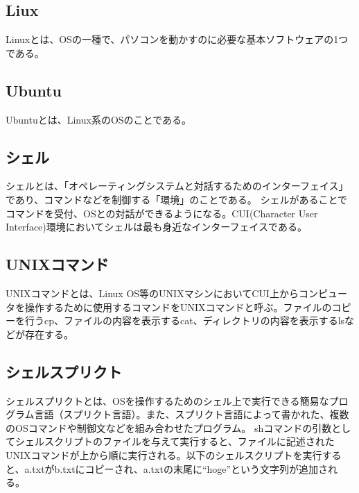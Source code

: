 



\subsection{Liux}
Linuxとは、OSの一種で、パソコンを動かすのに必要な基本ソフトウェアの1つである。


\subsection{Ubuntu}
Ubuntuとは、Linux系のOSのことである。


\subsection{シェル}
シェルとは、「オペレーティングシステムと対話するためのインターフェイス」であり、コマンドなどを制御する「環境」のことである。
シェルがあることでコマンドを受付、OSとの対話ができるようになる。CUI(Character User Interface)環境においてシェルは最も身近なインターフェイスである。


\subsection{UNIXコマンド}
UNIXコマンドとは、Linux OS等のUNIXマシンにおいてCUI上からコンピュータを操作するために使用するコマンドをUNIXコマンドと呼ぶ。ファイルのコピーを行うcp、ファイルの内容を表示するcat、ディレクトリの内容を表示するlsなどが存在する。


\subsection{シェルスプリクト}
シェルスプリクトとは、OSを操作するためのシェル上で実行できる簡易なプログラム言語（スプリクト言語）。また、スプリクト言語によって書かれた、複数のOSコマンドや制御文などを組み合わせたプログラム。
shコマンドの引数としてシェルスクリプトのファイルを与えて実行すると、ファイルに記述されたUNIXコマンドが上から順に実行される。以下のシェルスクリプトを実行すると、a.txtがb.txtにコピーされ、a.txtの末尾に“hoge”という文字列が追加される。



